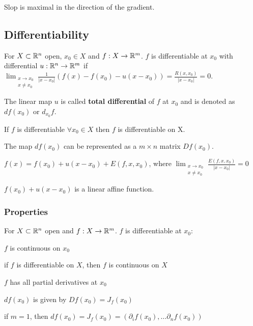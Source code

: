 \begin{compactitem}
    \item Slop is maximal in the direction of the gradient.
\end{compactitem}

\subsection{Differentiability}
For $X \subset \mathbb{R}^n$ open, $x_0 \in X$ and $f: X \to \mathbb{R}^m$. $f$ is differentiable at $x_0$ with differential $u: \mathbb{R}^n \to \mathbb{R}^m$ if $\lim_{\substack{x \to x_0\\ x \neq  x_0}} \frac{1}{|x - x_0|}(f(x) - f(x_0) - u(x - x_0)) = \frac{R(x, x_0)}{|x - x_0|} = 0$.
\begin{compactitem}
    \item The linear map $u$ is called \textbf{total differential} of $f$ at $x_0$ and is denoted as $df(x_0)$ or $d_{x_0}f$.
    \item If $f$ is differentiable $\forall x_0 \in X$ then $f$ is differentiable on X.
    \item The map $df(x_0)$ can be represented as a $m \times n$ matrix $Df(x_0)$.
    \item $f(x) = f(x_0) + u(x - x_0) + E(f, x, x_0)$, where $\lim_{\substack{x \to x_0 \\ x \neq x_0}} \frac{E(f, x, x_0)}{|x - x_0|} = 0$
        \begin{compactitem}
            \item $f(x_0) + u(x - x_0)$ is a linear affine function.
        \end{compactitem}
\end{compactitem}

\subsubsection{Properties}
For $X \subset \mathbb{R}^n$ open and $f: X \to \mathbb{R}^m$. $f$ is differentiable at $x_0$:
\begin{compactitem}
    \item $f$ is continuous on $x_0$
        \begin{compactitem}
            \item if $f$ is differentiable on $X$, then $f$ is continuous on $X$
        \end{compactitem}
    \item $f$ has all partial derivatives at $x_0$
    \item $df(x_0)$ is given by $Df(x_0) = J_f(x_0)$
        \begin{compactitem}
            \item if $m = 1$, then $df(x_0) = J_f(x_0) = (\partial_i f(x_0), \dots \partial_n f(x_0))$
        \end{compactitem}
\end{compactitem}

